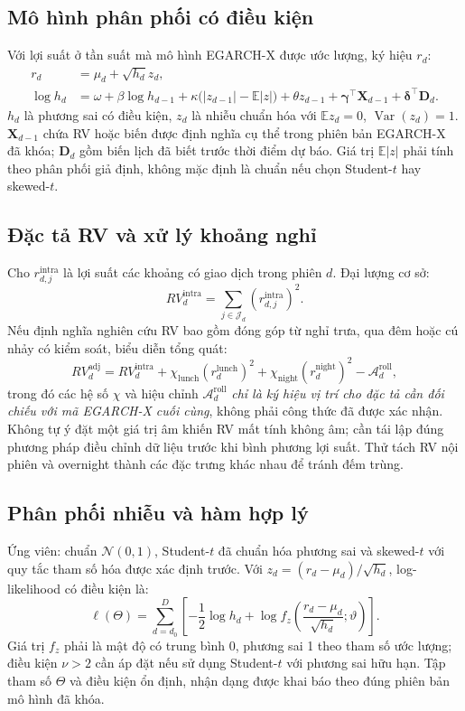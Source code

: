 \documentclass[12pt,a4paper,oneside]{article}
\newcommand{\E}{\mathbb{E}}
\newcommand{\Var}{\operatorname{Var}}
\begin{document}
\subsection{Mô hình phân phối có điều kiện}
Với lợi suất ở tần suất mà mô hình EGARCH-X được ước lượng, ký hiệu $r_d$:
\begin{align}
r_d&=\mu_d+\sqrt{h_d}z_d,\\
\log h_d&=\omega+\beta\log h_{d-1}+\kappa\big(|z_{d-1}|-\E|z|\big)
+\theta z_{d-1}+\bm\gamma^\top\bm X_{d-1}+\bm\delta^\top\bm D_d.
\end{align}
$h_d$ là phương sai có điều kiện, $z_d$ là nhiễu chuẩn hóa với $\E z_d=0$, $\Var(z_d)=1$. $\bm X_{d-1}$ chứa RV hoặc biến được định nghĩa cụ thể trong phiên bản EGARCH-X đã khóa; $\bm D_d$ gồm biến lịch đã biết trước thời điểm dự báo. Giá trị $\E|z|$ phải tính theo phân phối giả định, không mặc định là chuẩn nếu chọn Student-$t$ hay skewed-$t$.

\subsection{Đặc tả RV và xử lý khoảng nghỉ}
Cho $r_{d,j}^{\mathrm{intra}}$ là lợi suất các khoảng có giao dịch trong phiên $d$. Đại lượng cơ sở:
\begin{equation}
RV_d^{\mathrm{intra}}=\sum_{j\in\mathcal J_d}(r_{d,j}^{\mathrm{intra}})^2.
\end{equation}
Nếu định nghĩa nghiên cứu RV bao gồm đóng góp từ nghỉ trưa, qua đêm hoặc cú nhảy có kiểm soát, biểu diễn tổng quát:
\begin{equation}
RV_d^{\mathrm{adj}}=RV_d^{\mathrm{intra}}+
\chi_{\mathrm{lunch}}(r_d^{\mathrm{lunch}})^2+
\chi_{\mathrm{night}}(r_d^{\mathrm{night}})^2-
\mathcal A_d^{\mathrm{roll}},
\end{equation}
trong đó các hệ số $\chi$ và hiệu chỉnh $\mathcal A_d^{\mathrm{roll}}$ \emph{chỉ là ký hiệu vị trí cho đặc tả cần đối chiếu với mã EGARCH-X cuối cùng}, không phải công thức đã được xác nhận. Không tự ý đặt một giá trị âm khiến RV mất tính không âm; cần tái lập đúng phương pháp điều chỉnh dữ liệu trước khi bình phương lợi suất. Thử tách RV nội phiên và overnight thành các đặc trưng khác nhau để tránh đếm trùng.

\subsection{Phân phối nhiễu và hàm hợp lý}
Ứng viên: chuẩn $\mathcal N(0,1)$, Student-$t$ đã chuẩn hóa phương sai và skewed-$t$ với quy tắc tham số hóa được xác định trước. Với $z_d=(r_d-\mu_d)/\sqrt{h_d}$, log-likelihood có điều kiện là:
\begin{equation}
\ell(\Theta)=\sum_{d=d_0}^{D}\left[-\frac12\log h_d+
\log f_z\left(\frac{r_d-\mu_d}{\sqrt{h_d}};\vartheta\right)\right].
\end{equation}
Giá trị $f_z$ phải là mật độ có trung bình 0, phương sai 1 theo tham số ước lượng; điều kiện $\nu>2$ cần áp đặt nếu sử dụng Student-$t$ với phương sai hữu hạn. Tập tham số $\Theta$ và điều kiện ổn định, nhận dạng được khai báo theo đúng phiên bản mô hình đã khóa.
\end{document}
